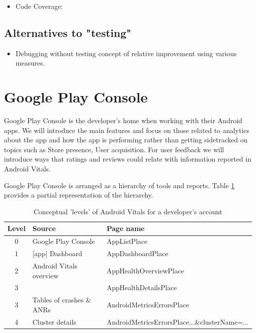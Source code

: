 
\begin{itemize}
    \item Code Coverage:
\end{itemize} 

\subsection{Alternatives to "testing"}
\begin{itemize}
    \item Debugging without testing concept of relative improvement using various measures.
\end{itemize}

\section{Google Play Console}
Google Play Console is the developer's home when working with their Android apps. We will introduce the main features and focus on those related to analytics about the app and how the app is performing rather than getting sidetracked on topics such as Store presence, User acquisition. For user feedback we will introduce ways that ratings and reviews could relate with information reported in Android Vitals.

Google Play Console is arranged as a hierarchy of tools and reports. Table \ref{tab:android_vitals_hierarchy} provides a partial representation of the hierarchy.

\begin{table}[]
    \centering
    \begin{tabular}{c|l|l}
       Level  &Source &Page name  \\
       \hline
       
       0      &Google Play Console &AppListPlace \\
       1      &[app] Dashboard &AppDashboardPlace \\
       2      &Android Vitals overview &AppHealthOverviewPlace \\
       3      & &AppHealthDetailsPlace \\
       3      &Tables of crashes \& ANRs &AndroidMetricsErrorsPlace \\
       4      &Cluster details &AndroidMetricsErrorsPlace...\&clusterName=...
    \end{tabular}
    \caption{Conceptual 'levels' of Android Vitals for a developer's account}
    \label{tab:android_vitals_hierarchy}
\end{table}


